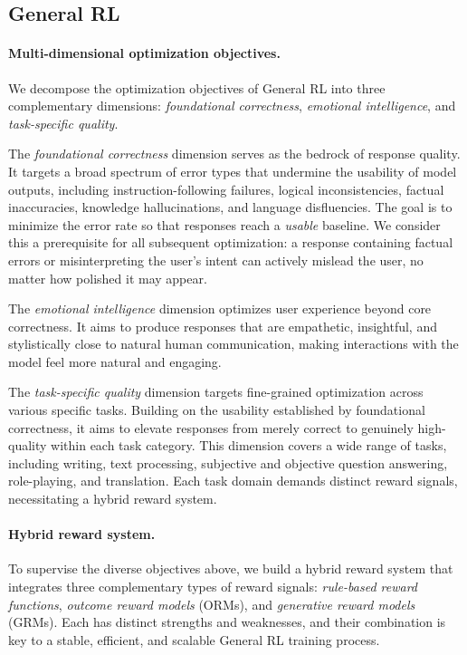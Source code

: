 \subsection{General RL}

\paragraph{Multi-dimensional optimization objectives.}
We decompose the optimization objectives of General RL into three complementary dimensions: \emph{foundational correctness}, \emph{emotional intelligence}, and \emph{task-specific quality}.

The \emph{foundational correctness} dimension serves as the bedrock of response quality. It targets a broad spectrum of error types that undermine the usability of model outputs, including instruction-following failures, logical inconsistencies, factual inaccuracies, knowledge hallucinations, and language disfluencies. The goal is to minimize the error rate so that responses reach a \emph{usable} baseline. We consider this a prerequisite for all subsequent optimization: a response containing factual errors or misinterpreting the user's intent can actively mislead the user, no matter how polished it may appear.

The \emph{emotional intelligence} dimension optimizes user experience beyond core correctness. It aims to produce responses that are empathetic, insightful, and stylistically close to natural human communication, making interactions with the model feel more natural and engaging.

The \emph{task-specific quality} dimension targets fine-grained optimization across various specific tasks. Building on the usability established by foundational correctness, it aims to elevate responses from merely correct to genuinely high-quality within each task category. This dimension covers a wide range of tasks, including writing, text processing, subjective and objective question answering, role-playing, and translation. Each task domain demands distinct reward signals, necessitating a hybrid reward system.

\paragraph{Hybrid reward system.}
To supervise the diverse objectives above, we build a hybrid reward system that integrates three complementary types of reward signals: \emph{rule-based reward functions}, \emph{outcome reward models} (ORMs), and \emph{generative reward models} (GRMs). Each has distinct strengths and weaknesses, and their combination is key to a stable, efficient, and scalable General RL training process.

